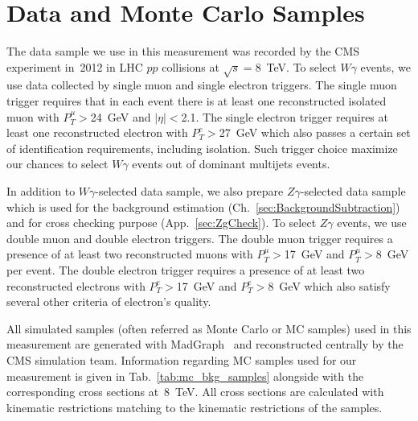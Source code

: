 \section{Data and Monte Carlo Samples}
\label{sec:DataAndMC}

The data sample we use in this measurement was recorded by the CMS experiment in~2012 in LHC $pp$ collisions at $\sqrt{s}=$8~TeV. To select $W\gamma$ events, we use data collected by single muon and single electron triggers. The single muon trigger requires that in each event there is at least one reconstructed isolated muon with $P_T^{\mu}>$24~GeV and $|\eta|<$2.1. The single electron trigger requires at least one reconstructed electron with $P_T^{e}>$27~GeV which also passes a certain set of identification requirements, including isolation. Such trigger choice maximize our chances to select $W\gamma$ events out of dominant multijets events.

In addition to $W\gamma$-selected data sample, we also prepare $Z\gamma$-selected data sample which is used for the background estimation (Ch.~\ref{sec:BackgroundSubtraction}) and for cross checking purpose (App.~\ref{sec:ZgCheck}). To select $Z\gamma$ events, we use double muon and double electron triggers. The double muon trigger requires a presence of at least two reconstructed muons with $P_T^{\mu}>$17~GeV and $P_T^{\mu}>$8~GeV per event. The double electron trigger requires a presence of at least two reconstructed electrons with $P_T^{e}>$17~GeV and $P_T^{e}>$8~GeV which also satisfy several other criteria of electron's quality.





All simulated samples (often referred as Monte Carlo or MC samples) used in this measurement are generated with MadGraph~\cite{ref_MadGraph} and reconstructed centrally by the CMS simulation team. Information regarding MC samples used for our measurement is given in Tab.~\ref{tab:mc_bkg_samples} alongside with the corresponding cross sections at~8~TeV. All cross sections are calculated with kinematic restrictions matching to the kinematic restrictions of the samples. 

